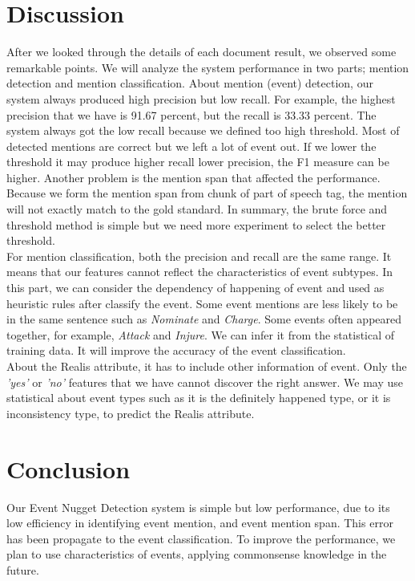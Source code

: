 \documentclass[11pt]{article}
\begin{document}
\section{Discussion}
\label{discuss}
After we looked through the details of each document result, we observed some remarkable points. We will analyze the system performance in two parts; mention detection and mention classification. About mention (event) detection, our system always produced high precision but low recall. For example, the highest precision that we have is 91.67 percent, but the recall is 33.33 percent. The system always got the low recall because we defined too high threshold. Most of detected mentions are correct but we left a lot of event out. If we lower the threshold it may produce higher recall lower precision, the F1 measure can be higher. Another problem is the mention span that affected the performance. Because we form the mention span from chunk of part of speech tag, the mention will not exactly match to the gold standard. In summary, the brute force and threshold method is simple but we need more experiment to select the better threshold.\\ 
\indent For mention classification, both the precision and recall are the same range. It means that our features cannot reflect the characteristics of event subtypes. In this part, we can consider the dependency of happening of event and used as heuristic rules after classify the event. Some event mentions are less likely to be in the same sentence such as {\em Nominate} and {\em Charge}. Some events often appeared together, for example, {\em Attack} and {\em Injure}. We can infer it from the statistical of training data. It will improve the accuracy of the event classification.\\ \indent About the Realis attribute, it has to include other information of event. Only the {\em 'yes'} or {\em 'no'} features that we have cannot discover the right answer. We may use statistical about event types such as it is the definitely happened type, or it is inconsistency type, to predict the Realis attribute.


\section{Conclusion}
\label{conclude}
Our Event Nugget Detection system is simple but low performance, due to its low efficiency in identifying event mention, and event mention span. This error has been propagate to the event classification. To improve the performance, we plan to use characteristics of events, applying commonsense knowledge in the future.
\end{document}
